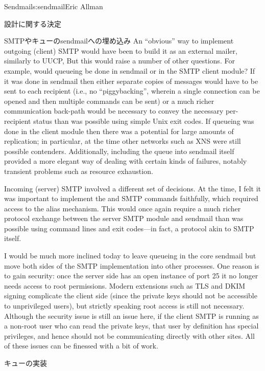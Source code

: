 \begin{aosachapter}{Sendmail}{s:sendmail}{Eric Allman}
\begin{aosasect1}{設計に関する決定}
\begin{aosasect2}{SMTPやキューのsendmailへの埋め込み}
An ``obvious'' way to implement outgoing (client) SMTP would have been
to build it as an external mailer, similarly to UUCP,  But this would
raise a number of other questions. For example, would queueing be done
in sendmail or in the SMTP client module? If it was done in sendmail
then either separate copies of messages would have to be sent to each
recipient (i.e., no ``piggybacking'', wherein a single connection can
be opened and then multiple  commands can be sent) or a much
richer communication back-path would be necessary to convey the
necessary per-recipient status than was possible using simple Unix
exit codes. If queueing was done in the client module then there was a
potential for large amounts of replication; in particular, at the time
other networks such as XNS were still possible
contenders. Additionally, including the queue into sendmail itself
provided a more elegant way of dealing with certain kinds of failures,
notably transient problems such as resource exhaustion.

Incoming (server) SMTP involved a different set of decisions. At the
time, I felt it was important to implement the  and
 SMTP commands faithfully, which required access to the
alias mechanism.  This would once again require a much richer protocol
exchange between the server SMTP module and sendmail than was possible
using command lines and exit codes---in fact, a protocol akin to SMTP
itself.

I would be much more inclined today to leave queueing in the core
sendmail but move both sides of the SMTP implementation into other
processes. One reason is to gain security: once the server side has an
open instance of port 25 it no longer needs access to root
permissions. Modern extensions such as TLS and DKIM signing complicate
the client side (since the private keys should not be accessible to
unprivileged users), but strictly speaking root access is still not
necessary. Although the security issue is still an issue here, if the
client SMTP is running as a non-root user who can read the private
keys, that user by definition has special privileges, and hence should
not be communicating directly with other sites. All of these issues
can be finessed with a bit of work.

\end{aosasect2}

\begin{aosasect2}{キューの実装}


\end{aosasect2}
\end{aosasect1}
\end{aosachapter}
